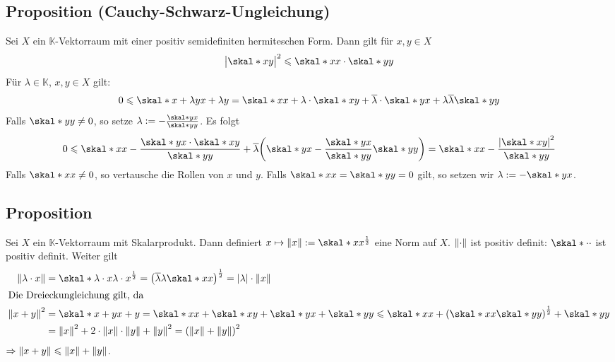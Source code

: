 \subsection{Proposition (Cauchy-Schwarz-Ungleichung)} %
\label{sub:74}
Sei $X$ ein $\mathds{K}$-Vektorraum mit einer positiv semidefiniten hermiteschen Form. Dann gilt für $x,y \in X$ 
\[
	\abs[\big]{\skal*{x}{y}}^2 \le \skal*{x}{x} \cdot \skal*{y}{y}
\]
Für $\lambda \in \mathds{K}$, $x,y \in X$ gilt: 
\begin{align*}
0 \le \skal*{x+\lambda y}{x + \lambda y} = \skal*{x}{x} + \lambda \cdot \skal*{x}{y} + \overline{\lambda} \cdot \skal*{y}{x} + \lambda \overline{\lambda} \skal*{y}{y}  
\end{align*}
Falls $\skal*{y}{y} \not=0$, so setze $\lambda := - \frac{\skal*{y}{x}}{\skal*{y}{y}}$. Es folgt 
\begin{align*}
	0 \le \skal*{x}{x} - \frac{\skal*{y}{x} \cdot \skal*{x}{y}}{\skal*{y}{y}} + \overline{\lambda} \enbrace*{\skal*{y}{x}  - \frac{\skal*{y}{x}}{\skal*{y}{y}} \skal*{y}{y}   } = \skal*{x}{x} - \frac{\abs*{\skal*{x}{y}}^2 }{\skal*{y}{y}} 
\end{align*}
Falls $\skal*{x}{x} \not= 0$, so vertausche die Rollen von $x$ und $y$. Falls $\skal*{x}{x}=\skal*{y}{y}=0$ gilt, so setzen wir $\lambda := - \skal*{y}{x}$. \bewende

\subsection[Proposition: Ein Skalarprodukt definiert eine Norm]{Proposition} %
\label{sub:75}
Sei $X$ ein $\mathds{K}$-Vektorraum mit Skalarprodukt. Dann definiert $x \mapsto \norm{x} := \skal*{x}{x}^{\frac{1}{2}}$ eine Norm auf $X$.
$\norm{\cdot }$ ist positiv definit: $\skal*{\cdot}{\cdot}$ ist positiv definit. Weiter gilt
\begin{align*}
	\norm{\lambda \cdot x} &= \skal*{\lambda \cdot x}{\lambda \cdot x}^{\frac{1}{2}} = \enbrace*{\overline{\lambda} \lambda \skal*{x}{x}}^{\frac{1}{2}} 
	= \abs*{\lambda} \cdot \norm{x}    \\
	\shortintertext{Die Dreieckungleichung gilt, da}
	\norm{x+y}^2 &= \skal*{x+y}{x+y} = \skal*{x}{x} + \skal*{x}{y} + \skal*{y}{x} + \skal*{y}{y} \le \skal*{x}{x} +  \enbrace*{\skal*{x}{x} \skal*{y}{y}}^{\frac{1}{2}}
	+ \skal*{y}{y}  \\
	&= \norm{x}^2 + 2 \cdot \norm{x} \cdot \norm{y} + \norm{y}^2 = \enbrace*{\norm{x} + \norm{y}}^2    
\end{align*}
$\Rightarrow \norm{x+y} \le \norm{x} + \norm{y}$. \bewende

